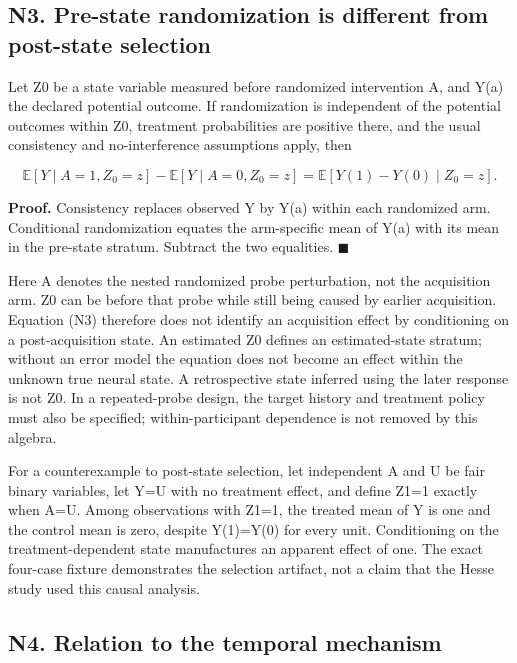 \documentclass[
  american,
  11pt,
  letterpaper,
]{article}
\begin{document}
\subsection{N3. Pre-state randomization is different from post-state selection}\label{n3.-pre-state-randomization-is-different-from-post-state-selection}

Let Z0 be a state variable measured before randomized intervention A, and Y(a) the declared potential outcome. If randomization is independent of the potential outcomes within Z0, treatment probabilities are positive there, and the usual consistency and no-interference assumptions apply, then

\begin{equation}
\mathbb E[Y\mid A=1,Z_0=z]-\mathbb E[Y\mid A=0,Z_0=z]
=\mathbb E[Y(1)-Y(0)\mid Z_0=z].\tag{N3}
\end{equation}

\textbf{Proof.} Consistency replaces observed Y by Y(a) within each randomized arm. Conditional randomization equates the arm-specific mean of Y(a) with its mean in the pre-state stratum. Subtract the two equalities. \(\blacksquare\)

Here A denotes the nested randomized probe perturbation, not the acquisition arm. Z0 can be before that probe while still being caused by earlier acquisition. Equation (N3) therefore does not identify an acquisition effect by conditioning on a post-acquisition state. An estimated Z0 defines an estimated-state stratum; without an error model the equation does not become an effect within the unknown true neural state. A retrospective state inferred using the later response is not Z0. In a repeated-probe design, the target history and treatment policy must also be specified; within-participant dependence is not removed by this algebra.

For a counterexample to post-state selection, let independent A and U be fair binary variables, let Y=U with no treatment effect, and define Z1=1 exactly when A=U. Among observations with Z1=1, the treated mean of Y is one and the control mean is zero, despite Y(1)=Y(0) for every unit. Conditioning on the treatment-dependent state manufactures an apparent effect of one. The exact four-case fixture demonstrates the selection artifact, not a claim that the Hesse study used this causal analysis.

\subsection{N4. Relation to the temporal mechanism}\label{n4.-relation-to-the-temporal-mechanism}
\end{document}

